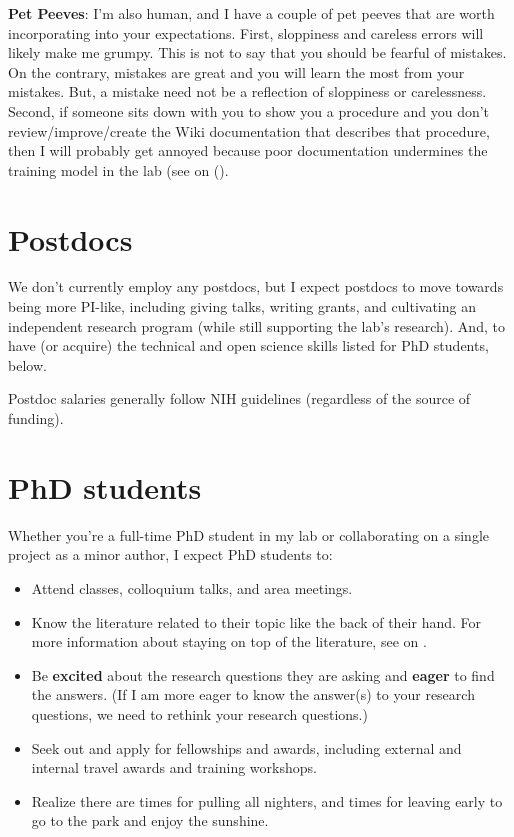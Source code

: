 \documentclass[letterpaper,11pt,oneside]{memoir}
\begin{document}
\noindent \textbf{Pet Peeves}: I'm also human, and I have a couple of pet peeves that are worth incorporating into your expectations. First, sloppiness and careless errors will likely make me grumpy. This is not to say that you should be fearful of mistakes. On the contrary, mistakes are great and you will learn the most from your mistakes. But, a mistake need not be a reflection of sloppiness or carelessness. Second, if someone sits down with you to show you a procedure and you don't review/improve/create the Wiki documentation that describes that procedure, then I will probably get annoyed because poor documentation undermines the training model in the lab (see  on ().

\section{Postdocs}

We don't currently employ any postdocs, but I expect postdocs to move towards being more PI-like, including giving talks, writing grants, and cultivating an independent research program (while still supporting the lab's research). And, to have (or acquire) the technical and open science skills listed for PhD students, below.


Postdoc salaries generally follow NIH guidelines (regardless of the source of funding).


\section{PhD students}

Whether you're a full-time PhD student in my lab or collaborating on a single project as a minor author, I expect PhD students to:

\begin{itemize}
\item Attend classes, colloquium talks, and area meetings.
\item Know the literature related to their topic like the back of their hand. For more information about staying on top of the literature, see  on .
\item Be \textbf{excited} about the research questions they are asking and \textbf{eager} to find the answers. (If I am more eager to know the answer(s) to your research questions, we need to rethink your research questions.)
\item Seek out and apply for fellowships and awards, including external and internal travel awards and training workshops.
\item Realize there are times for pulling all nighters, and times for leaving early to go to the park and enjoy the sunshine.
\end{itemize}
\end{document}
